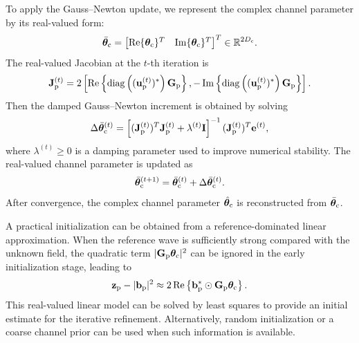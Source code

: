\documentclass[journal]{IEEEtran}
\begin{document}
To apply the Gauss--Newton update, we represent the complex channel parameter by its real-valued form:
\begin{equation}
\bar{\boldsymbol{\theta}}_{\rm c}
=
\begin{bmatrix}
\operatorname{Re}\{\boldsymbol{\theta}_{\rm c}\}^T &
\operatorname{Im}\{\boldsymbol{\theta}_{\rm c}\}^T
\end{bmatrix}^T
\in\mathbb{R}^{2D_{\rm c}}.
\end{equation}
The real-valued Jacobian at the $t$-th iteration is
\begin{equation}
\mathbf{J}_{\rm p}^{(t)}
=
2
\left[
\operatorname{Re}
\left\{
\operatorname{diag}
\left(
(\mathbf{u}_{\rm p}^{(t)})^*
\right)
\mathbf{G}_{\rm p}
\right\},
-
\operatorname{Im}
\left\{
\operatorname{diag}
\left(
(\mathbf{u}_{\rm p}^{(t)})^*
\right)
\mathbf{G}_{\rm p}
\right\}
\right].
\label{eq:channel_estimation_jacobian}
\end{equation}
Then the damped Gauss--Newton increment is obtained by solving
\begin{equation}
\Delta\bar{\boldsymbol{\theta}}_{\rm c}^{(t)}
=
\left[
(\mathbf{J}_{\rm p}^{(t)})^T\mathbf{J}_{\rm p}^{(t)}
+
\lambda^{(t)}\mathbf{I}
\right]^{-1}
(\mathbf{J}_{\rm p}^{(t)})^T
\mathbf{e}^{(t)},
\label{eq:channel_gn_update}
\end{equation}
where $\lambda^{(t)}\geq 0$ is a damping parameter used to improve numerical stability. 
The real-valued channel parameter is updated as
\begin{equation}
\bar{\boldsymbol{\theta}}_{\rm c}^{(t+1)}
=
\bar{\boldsymbol{\theta}}_{\rm c}^{(t)}
+
\Delta\bar{\boldsymbol{\theta}}_{\rm c}^{(t)}.
\label{eq:channel_real_update}
\end{equation}
After convergence, the complex channel parameter $\hat{\boldsymbol{\theta}}_{\rm c}$ is reconstructed from $\bar{\boldsymbol{\theta}}_{\rm c}$.

A practical initialization can be obtained from a reference-dominated linear approximation. 
When the reference wave is sufficiently strong compared with the unknown field, the quadratic term $|\mathbf{G}_{\rm p}\boldsymbol{\theta}_{\rm c}|^2$ can be ignored in the early initialization stage, leading to
\begin{equation}
\mathbf{z}_{\rm p}
-
|\mathbf{b}_{\rm p}|^2
\approx
2\operatorname{Re}
\left\{
\mathbf{b}_{\rm p}^*
\odot
\mathbf{G}_{\rm p}\boldsymbol{\theta}_{\rm c}
\right\}.
\label{eq:channel_linear_initialization}
\end{equation}
This real-valued linear model can be solved by least squares to provide an initial estimate for the iterative refinement. 
Alternatively, random initialization or a coarse channel prior can be used when such information is available.
\end{document}

